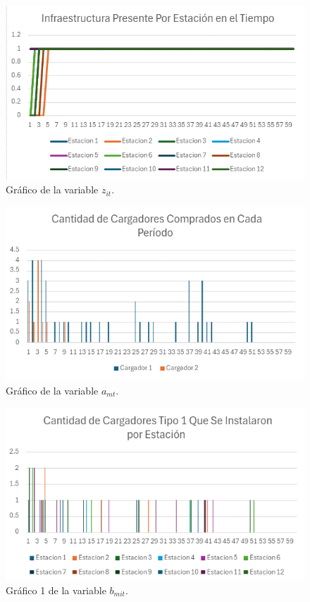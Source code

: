 \documentclass[letterpaper]{article}
\begin{document}
\begin{flushleft}
		\begin{figure}[htbp]
			\centering
			\includegraphics[scale=0.9]{imagenes/zit.png}
			\caption{Gráfico de la variable $z_{it}$.}
			\label{fig:grafica-zit}
		\end{figure}

		\begin{figure}[htbp]
			\centering
			\includegraphics[scale=0.9]{imagenes/amt.png}
			\caption{Gráfico de la variable $a_{mt}$.}
			\label{fig:grafica-amt}
		\end{figure}

		\begin{figure}[htbp]
			\centering
			\includegraphics[scale=0.9]{imagenes/bmit1.png}
			\caption{Gráfico 1 de la variable $b_{mit}$.}
			\label{fig:grafica-bmit1}
		\end{figure}


\end{flushleft}
\end{document}
